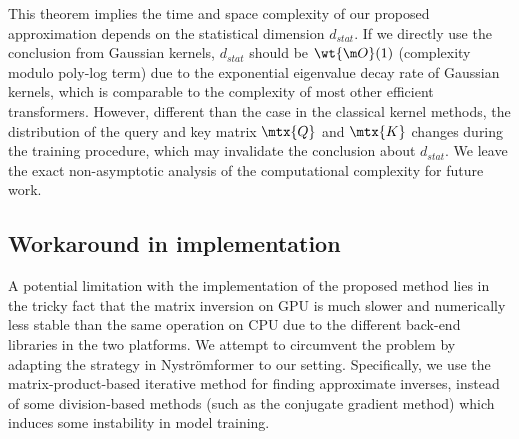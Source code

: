 This theorem implies the time and space complexity of our proposed approximation depends on the statistical dimension $d_{stat}$.
If we directly use the conclusion from Gaussian kernels, $d_{stat}$ should be $\wt{\m O}(1)$ (complexity modulo poly-log term) \citep{yang2017randomized} due to the exponential eigenvalue decay rate of Gaussian kernels,  
which is comparable to the complexity of most other efficient transformers.
However, different than the case in the classical kernel methods, the distribution of the query and key matrix $\mtx{Q}$ and $\mtx{K}$ changes during the training procedure,
which may invalidate the conclusion about $d_{stat}$.
We leave the exact non-asymptotic analysis of the computational complexity for future work.





\subsection{Workaround in implementation}
\label{sec:method_implementation}

A potential limitation with the implementation of the proposed method lies in the tricky fact that the matrix inversion on GPU is much slower and numerically less stable than the same operation on CPU due to the different back-end libraries in the two platforms.
We attempt to circumvent the problem by adapting the strategy in Nystr\"{o}mformer \citep{DBLP:journals/corr/abs-2102-03902} to our setting.
Specifically, we use the matrix-product-based iterative method \citep{razavi2014new} for finding approximate inverses, instead of some division-based methods (such as the conjugate gradient method) which induces some instability in model training.

